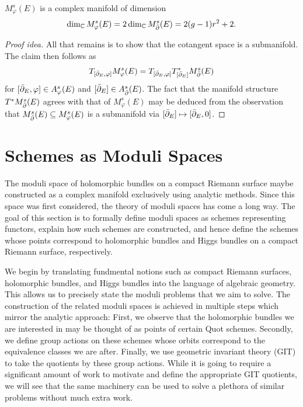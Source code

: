 \documentclass[12pt]{ociamthesis}  %
\begin{document}
\begin{corollary}
  $M^s_\varphi(E)$ is a complex manifold of dimension
  \begin{align*}
    \dim_{\mathbb C}M^s_{\varphi}(E)
    =2\dim_{\mathbb C}M^s_{\bar{\partial}}(E)
    =2(g-1)r^2 + 2.
  \end{align*}
  \begin{proof}[Proof idea]
    All that remains is to show that the cotangent space is a submanifold.
    The claim then follows as
    \begin{align*}
      T_{[{\bar{\partial}}_E,\varphi]}M^s_\varphi(E) = T_{[{\bar{\partial}}_E,\varphi]} T^*_{[{\bar{\partial}}_E]}M^s_{\bar{\partial}}(E)
    \end{align*}
    for $[{\bar{\partial}}_E,\varphi] \in A^s_\varphi(E)$ and
    $[{\bar{\partial}}_E]\in A^s_{\bar{\partial}}(E)$. The fact that the manifold
    structure $T^*M^s_{\bar{\partial}}(E)$ agrees with that of $M^s_{\varphi}(E)$
    may be deduced from the observation that
    $M^s_{\bar{\partial}}(E) \subseteq M^s_\varphi(E)$ is a submanifold
    via $[{\bar{\partial}}_E] \mapsto [{\bar{\partial}}_E,0]$.
  \end{proof}
\end{corollary}

\chapter{Schemes as Moduli Spaces}

The moduli space of holomorphic bundles on a compact Riemann
surface maybe constructed as a complex manifold exclusively
using analytic methods. Since this space was first considered,
the theory of moduli spaces has come a long way.
The goal of this section is to formally define moduli spaces
as schemes representing functors, explain how such schemes
are constructed, and hence define the schemes whose
points correspond to holomorphic bundles and Higgs bundles
on a compact Riemann surface, respectively.

We begin by translating fundmental notions such as compact
Riemann surfaces, holomorphic bundles, and Higgs bundles into
the language of algebraic geometry. This allows us to precisely state
the moduli problems that we aim to solve. The construction
of the related moduli spaces is achieved in multiple steps which
mirror the analytic approach: First, we observe that the
holomorphic bundles we are interested in may be thought of as
points of certain Quot schemes. Secondly, we define group
actions on these schemes whose orbits correspond to the
equivalence classes we are after. Finally, we use geometric
invariant theory (GIT) to take the quotients by these group
actions. While it is going to require a significant amount of
work to motivate and define the appropriate GIT quotients,
we will see that the same machinery can be used to solve
a plethora of similar problems without much extra work.
\end{document}

